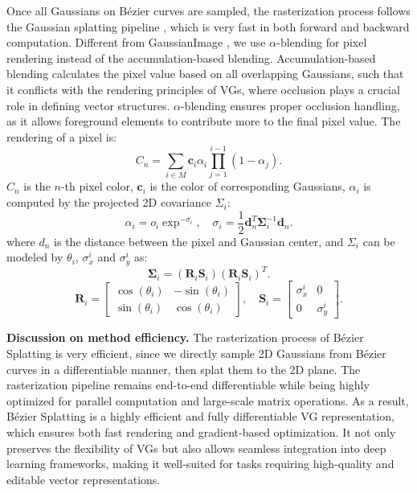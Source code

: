 \label{sec:rasterizer}
Once all Gaussians on Bézier curves are sampled, the rasterization process follows the Gaussian splatting pipeline \cite{kerbl3Dgaussians}, which is very fast in both forward and backward computation. Different from GaussianImage \cite{zhang2024gaussianimage}, we use $\alpha$-blending for pixel rendering instead of the accumulation-based blending. 
Accumulation-based blending calculates the pixel value based on all overlapping Gaussians, such that it conflicts with the rendering principles of VGs, where occlusion plays a crucial role in defining vector structures.
$\alpha$-blending ensures proper occlusion handling, as it allows foreground elements to contribute more to the final pixel value. 
The rendering of a pixel is:
\begin{equation}
    C_n = \sum_{i \in M}\mathbf{c}_i\alpha_i \prod_{j=1}^{i-1}(1 - \alpha_j).
\end{equation} 
$C_n$ is the $n$-th pixel color, $\mathbf{c}_i$ is the color of corresponding Gaussians, $\alpha_i$ is computed by the projected 2D covariance $\Sigma_i$:
\begin{equation}
\alpha_i = o_i \exp^{-\sigma_i}, \quad 
\sigma_i = \frac{1}{2} \boldsymbol{d}_n^T \boldsymbol{\Sigma}^{-1}_{i} \boldsymbol{d}_n.
\label{eq:rasterization2}
\end{equation}
where $d_n$ is the distance between the pixel and Gaussian center, and $\Sigma_i$ can be modeled by $\theta_i$, $\sigma_x^i$ and $\sigma_y^i$ as:
\begin{equation}
\boldsymbol{\Sigma}_i = (\boldsymbol{R}_i \boldsymbol{S}_i)(\boldsymbol{R}_i \boldsymbol{S}_i)^T.
\label{eq:RSSR}
\end{equation}
\begin{equation}
\boldsymbol{R}_i =
\begin{bmatrix}
\cos(\theta_i) & -\sin(\theta_i) \\
\sin(\theta_i) & \cos(\theta_i)
\end{bmatrix},
\quad
\boldsymbol{S}_i =
\begin{bmatrix}
\sigma_{x}^i & 0 \\
0 & \sigma_{y}^i
\end{bmatrix}.
\label{eq:rot_scale}
\end{equation}

\noindent\textbf{Discussion on method efficiency.}
The rasterization process of Bézier Splatting is very efficient, since we directly sample 2D Gaussians from Bézier curves in a differentiable manner, then splat them to the 2D plane. The rasterization pipeline remains end-to-end differentiable while being highly optimized for parallel computation and large-scale matrix operations.
As a result, Bézier Splatting is a highly efficient and fully differentiable VG representation, which ensures both fast rendering and gradient-based optimization. It not only preserves the flexibility of VGs but also allows seamless integration into deep learning frameworks, making it well-suited for tasks requiring high-quality and editable vector representations.


